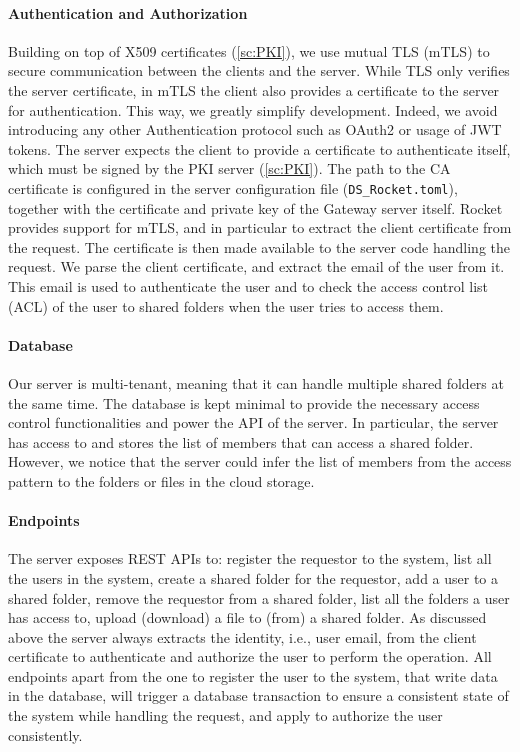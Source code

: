 \paragraph{Authentication and Authorization}
Building on top of X509 certificates (\cref{sc:PKI}), we use
mutual TLS (mTLS) to 
secure communication between the clients and the server.
While TLS only verifies the server certificate,
in mTLS the client also provides a certificate to the server
for authentication.
This way, we greatly simplify development. Indeed, we 
avoid introducing any other Authentication
protocol such as OAuth2 or usage of JWT tokens. 
The server expects the client to provide a certificate
to authenticate itself, which must be signed by the
PKI server (\cref{sc:PKI}).
The path to the CA certificate is configured in the
server configuration file (\texttt{DS\_Rocket.toml}),
together with the certificate and private key of the
Gateway server itself. Rocket provides support for
mTLS, and in particular to extract the client
certificate from the request. The certificate is then
made available to the server code handling the request.
We parse the client certificate, and extract the email
of the user from it. This email is used to authenticate
the user and to check the access control list (ACL)
of the user to shared folders when the user tries to
access them.

\paragraph{Database}
Our server is multi-tenant, meaning that it can handle
multiple shared folders at the same time.
The database is kept minimal to provide the necessary 
access control functionalities and power the
API of the server. In particular, the server has access to
and stores the list of members that can access a shared folder.
However, we notice that the server could infer the list of members
from the access pattern to the folders or files
in the cloud storage.


\paragraph{Endpoints}
The server exposes REST APIs to: register the requestor to the system,
list all the users in the system,
create a shared folder for the requestor,
add a user to a shared folder,
remove the requestor from a shared folder,
list all the folders a user has access to,
upload (download) a file to (from) a shared folder.
As discussed above the server always extracts the identity,
i.e., user email, from the client certificate to authenticate
and authorize the user to perform the operation.
All endpoints apart from the one to register the user
to the system, that write data in the database,
will trigger a database transaction 
to ensure a consistent state of the system while
handling the request, and apply to authorize the
user consistently.

